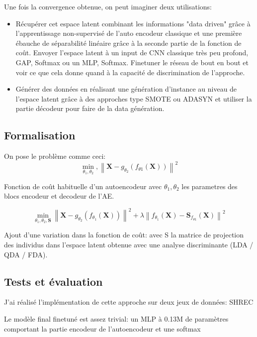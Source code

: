 Une fois la convergence obtenue, on peut imaginer deux utilisations:
\begin{itemize}
    \item Récupérer cet espace latent combinant les informations "data driven" grâce à l'apprentissage non-supervisé de l'auto encodeur classique et une première ébauche de séparabilité linéaire grâce à la seconde partie de la fonction de coût. Envoyer l'espace latent à un input de CNN classique très peu profond, GAP, Softmax ou un MLP, Softmax. Finetuner le réseau de bout en bout et voir ce que cela donne quand à la capacité de discrimination de l'approche. 
    \item Générer des données en réalisant une génération d'instance au niveau de l'espace latent grâce à des approches type SMOTE \cite{chawla2002smote} ou ADASYN \cite{he2008adasyn}  et utiliser la partie décodeur pour  faire de la data génération.
\end{itemize}

\subsection{Formalisation}
On pose le problème comme ceci: \newline
$$\min _{\theta_{1}, \theta_{2}},\left\|\mathbf{X}-g_{\theta_{2}}\left(f_{\theta 1}(\mathbf{X})\right)\right\|^{2}$$

Fonction de coût habituelle d'un autoencodeur avec $\theta_{1}, \theta_{2}$ les parametres des blocs encodeur et decodeur de l’AE. 

$$\min _{\theta_{1}, \theta_{2}, \mathbf{S}}\left\|\mathbf{X}-g_{\theta_{2}}\left(f_{\theta_{1}}(\mathbf{X})\right)\right\|^{2}+\lambda\left\|f_{\theta_{1}}(\mathbf{X})-\mathbf{S}_{f_{\theta 1}}(\mathbf{X})\right\|^{2}$$

Ajout d'une variation dans la fonction de coût: avec S la matrice de projection des individus dans l'espace latent obtenue avec une analyse discriminante (LDA / QDA / FDA).

\subsection{Tests et évaluation}
J'ai réalisé l'implémentation de cette approche sur deux jeux de données: SHREC \cite{de2017shrec}

Le modèle final finetuné est assez trivial: un MLP à 0.13M de paramètres comportant la partie encodeur de l'autoencodeur et une softmax

